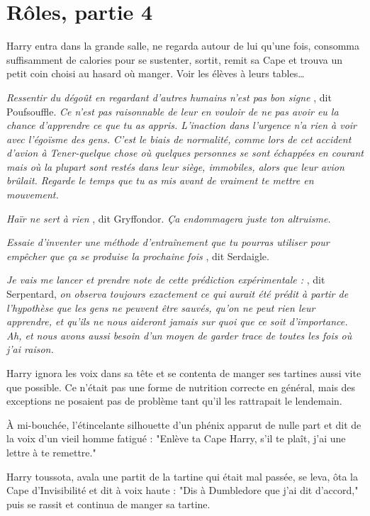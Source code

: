 
\chapter{Rôles, partie 4}

Harry entra dans la grande salle, ne regarda autour de lui qu'une fois, consomma suffisamment de calories pour se sustenter, sortit, remit sa Cape et trouva un petit coin choisi au hasard où manger. Voir les élèves à leurs tables…

\emph{Ressentir du dégoût en regardant d'autres humains n'est pas bon signe} , dit Poufsouffle. \emph{Ce n'est pas raisonnable de leur en vouloir de ne pas avoir eu la chance d'apprendre ce que tu as appris. L'inaction dans l'urgence n'a rien à voir avec l'égoïsme des gens. C'est le biais de normalité, comme lors de cet accident d'avion à Tener-quelque chose où quelques personnes se sont échappées en courant mais où la plupart sont restés dans leur siège, immobiles, alors que leur avion brûlait. Regarde le temps que tu as mis avant de vraiment te mettre en mouvement.} 

\emph{Haïr ne sert à rien} , dit Gryffondor. \emph{Ça endommagera juste ton altruisme.} 

\emph{Essaie d'inventer une méthode d'entraînement que tu pourras utiliser pour empêcher que ça se produise la prochaine fois} , dit Serdaigle.

\emph{Je vais me lancer et prendre note de cette prédiction expérimentale :} , dit Serpentard, \emph{on observa toujours exactement ce qui aurait été prédit à partir de l'hypothèse que les gens ne peuvent être sauvés, qu'on ne peut rien leur apprendre, et qu'ils ne nous aideront jamais sur quoi que ce soit d'importance. Ah, et nous avons aussi besoin d'un moyen de garder trace de toutes les fois où j'ai raison.} 

Harry ignora les voix dans sa tête et se contenta de manger ses tartines aussi vite que possible. Ce n'était pas une forme de nutrition correcte en général, mais des exceptions ne posaient pas de problème tant qu'il les rattrapait le lendemain.

À mi-bouchée, l'étincelante silhouette d'un phénix apparut de nulle part et dit de la voix d'un vieil homme fatigué : "Enlève ta Cape Harry, s'il te plaît, j'ai une lettre à te remettre."

Harry toussota, avala une partit de la tartine qui était mal passée, se leva, ôta la Cape d'Invisibilité et dit à voix haute : "Dis à Dumbledore que j'ai dit d'accord," puis se rassit et continua de manger sa tartine.

